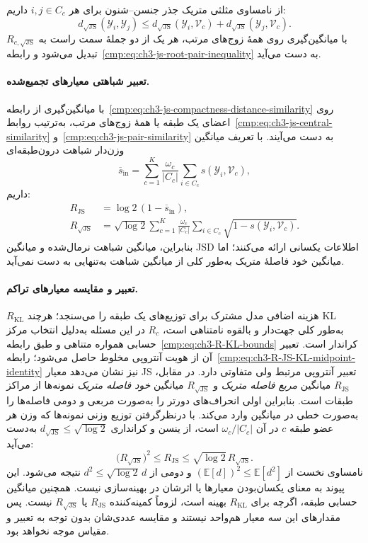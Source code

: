 از نامساوی مثلثی متریک جذر جنسن--شنون برای هر
$i,j\in C_c$ داریم:
\[
d_{\sqrt{\mathrm{JS}}}(\mathscr Y_i,\mathscr Y_j)
\le d_{\sqrt{\mathrm{JS}}}(\mathscr Y_i,\mathcal V_c)
+d_{\sqrt{\mathrm{JS}}}(\mathscr Y_j,\mathcal V_c).
\]
با میانگین‌گیری روی همهٔ زوج‌های مرتب، هر یک از دو
جملهٔ سمت راست به $R_{c,\sqrt{\mathrm{JS}}}$ تبدیل
می‌شود و رابطه~\eqref{cmp:eq:ch3-js-root-pair-inequality}
به دست می‌آید.

\paragraph{تعبیر شباهتی معیارهای تجمیع‌شده.}
با میانگین‌گیری از
رابطه~\eqref{cmp:eq:ch3-js-compactness-distance-similarity}
روی اعضای یک طبقه یا همهٔ زوج‌های مرتب، به‌ترتیب
روابط~\eqref{cmp:eq:ch3-js-central-similarity}
و~\eqref{cmp:eq:ch3-js-pair-similarity} به دست می‌آیند.
با تعریف میانگین وزن‌دار شباهت درون‌طبقه‌ای
\[
\overline s_{\mathrm{in}}=
\sum_{c=1}^K\frac{\omega_c}{|C_c|}
\sum_{i\in C_c}s(\mathscr Y_i,\mathcal V_c),
\]
داریم:
\begin{equation}\label{cmp:eq:ch3-R-JS-similarity-interpretation}
\begin{aligned}
R_{\mathrm{JS}}&=\log2\,(1-\overline s_{\mathrm{in}}),\\
R_{\sqrt{\mathrm{JS}}}&=\sqrt{\log2}
\sum_{c=1}^K\frac{\omega_c}{|C_c|}
\sum_{i\in C_c}\sqrt{1-s(\mathscr Y_i,\mathcal V_c)}.
\end{aligned}
\end{equation}
بنابراین، میانگین شباهت نرمال‌شده و میانگین JSD
اطلاعات یکسانی ارائه می‌کنند؛ اما میانگین خود فاصلهٔ
متریک به‌طور کلی از میانگین شباهت به‌تنهایی به دست
نمی‌آید.

\paragraph{تعبیر و مقایسه معیارهای تراکم.}
$R_{\mathrm{KL}}$ هزینه اضافی مدل مشترک
برای توزیع‌های یک طبقه را می‌سنجد؛
هرچند KL به‌طور کلی جهت‌دار و بالقوه نامتناهی است،
$R_c$ در این مسئله به‌دلیل انتخاب مرکز حسابی
همواره متناهی و طبق
رابطه~\eqref{cmp:eq:ch3-R-KL-bounds}
کراندار است. تعبیر آن از هویت
آنتروپی مخلوط حاصل می‌شود؛
رابطه~\eqref{cmp:eq:ch3-R-JS-KL-midpoint-identity}
نیز نشان می‌دهد معیار JS تعبیر
آنتروپی مرتبط ولی متفاوتی دارد.
در مقابل، $R_{\mathrm{JS}}$ میانگین
\emph{مربع فاصله متریک} و
$R_{\sqrt{\mathrm{JS}}}$ میانگین
\emph{خود فاصله متریک} نمونه‌ها
از مراکز طبقات است. بنابراین اولی
انحراف‌های دورتر را به‌صورت مربعی
و دومی فاصله‌ها را به‌صورت خطی
در میانگین وارد می‌کند.
با درنظرگرفتن توزیع وزنی نمونه‌ها
که وزن هر عضو طبقه $c$ در آن
$\omega_c/|C_c|$ است،
از ینسن و کرانداری
$d_{\sqrt{\mathrm{JS}}}\le\sqrt{\log2}$
به‌دست می‌آید:
\[
\bigl(R_{\sqrt{\mathrm{JS}}}\bigr)^2
\le R_{\mathrm{JS}}
\le \sqrt{\log2}\,R_{\sqrt{\mathrm{JS}}}.
\]
نامساوی نخست از
$(\mathbb E[d])^2\le\mathbb E[d^2]$
و دومی از $d^2\le\sqrt{\log2}\,d$
نتیجه می‌شود.
این پیوند به معنای
یکسان‌بودن معیارها یا اثرشان
در بهینه‌سازی نیست.
همچنین میانگین حسابی طبقه،
اگرچه برای $R_{\mathrm{KL}}$ بهینه است،
لزوماً کمینه‌کننده
$R_{\mathrm{JS}}$ یا
$R_{\sqrt{\mathrm{JS}}}$ نیست.
پس مقدارهای این سه معیار
هم‌واحد نیستند و مقایسه عددی‌شان
بدون توجه به تعبیر و مقیاس
موجه نخواهد بود.


